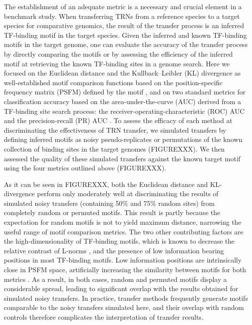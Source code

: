 The establishment of an adequate metric is a necessary and crucial element in a
benchmark study. When transferring TRNs from a reference species to a target
species for comparative genomics, the result of the transfer process is an
inferred TF-binding motif in the target species. Given the inferred and known
TF-binding motifs in the target genome, one can evaluate the accuracy of the
transfer process by directly comparing the motifs or by assessing the
efficiency of the inferred motif at retrieving the known TF-binding sites in a
genome search. Here we focused on the Euclidean distance and the
Kullback–Leibler (KL) divergence as well-established motif comparison functions
based on the position-specific frequency matrix (PSFM) defined by the motif
\cite{gupta2007quantifying}, and on two standard metrics for classification
accuracy based on the area-under-the-curve (AUC) derived from a TF-binding site
search process: the receiver-operating-characteristic (ROC) AUC and the
precision-recall (PR) AUC \cite{lewis1991evaluating, zweig1993receiver}. To
assess the efficacy of each method at discriminating the effectiveness of TRN
transfer, we simulated transfers by defining inferred motifs as noisy
pseudo-replicates or permutations of the known collection of binding sites in
the target genomes (FIGUREXXX). We then assessed the quality of these simulated
transfers against the known target motif using the four metrics outlined above
(FIGUREXXX).

As it can be seen in FIGUREXXX, both the Euclidean distance and KL-divergence
perform only moderately well at discriminating the results of simulated noisy
transfers (containing 50\% and 75\% random sites) from completely random or
permuted motifs. This result is partly because the expectation for random
motifs is not to yield maximum distance, narrowing the useful range of motif
comparison metrics. The two other contributing factors are the
high-dimensionality of TF-binding motifs, which is known to decrease the
relative contrast of L-norms \cite{aggarwal2001surprising}, and the presence of
low information bearing positions in most TF-binding motifs. Low information
positions are intrinsically close in PSFM space, artificially increasing the
similarity between motifs for both metrics \cite{zhang2013spic}. As a result,
in both cases, random and permuted motifs display a considerable spread,
leading to significant overlap with the results obtained for simulated noisy
transfers. In practice, transfer methods frequently generate motifs comparable
to the noisy transfers simulated here, and their overlap with random controls
therefore complicates the interpretation of transfer results.

